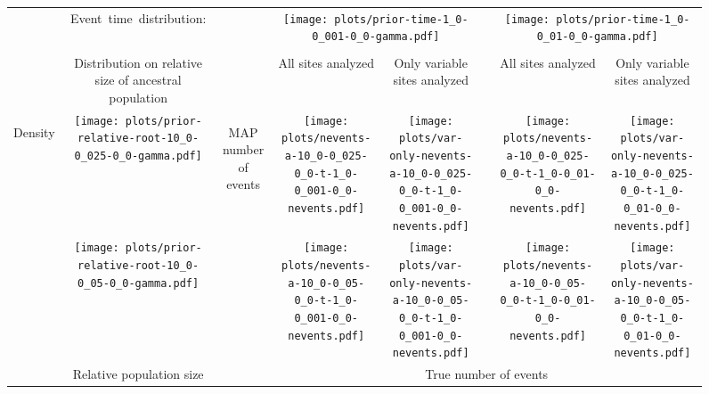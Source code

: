 \documentclass[border=10pt,varwidth=30cm]{standalone}
\begin{document}
\begin{figure}
    \centering
    \begin{tabular}{@{}cccccccc@{}}
        & \multirow{1}{0.15\textwidth}[8em]{\centering\Large Event~time~distribution:}
        &
        & \multicolumn{2}{c}{\texttt{[image: plots/prior-time-1\_0-0\_001-0\_0-gamma.pdf]}}
        &
        & \multicolumn{2}{c}{\texttt{[image: plots/prior-time-1\_0-0\_01-0\_0-gamma.pdf]}} \\
        \cline{1-2}\cline{4-5}\cline{7-8}
        & & & & & & & \\
        & \multirow{1}{0.15\textwidth}{\centering\Large Distribution on relative size of ancestral population}
        &
        & \multirow{1}{0.15\textwidth}{\centering\Large All sites analyzed}
        & \multirow{1}{0.15\textwidth}{\centering\Large Only variable sites analyzed}
        &
        & \multirow{1}{0.15\textwidth}{\centering\Large All sites analyzed}
        & \multirow{1}{0.15\textwidth}{\centering\Large Only variable sites analyzed} \\[9ex]
        \multirow{2}{*}[1em]{\begin{sideways}\large Density\end{sideways}}
        & \texttt{[image: plots/prior-relative-root-10\_0-0\_025-0\_0-gamma.pdf]}
        & \multirow{2}{*}[5em]{\begin{sideways}\large MAP number of events\end{sideways}}
        & \texttt{[image: plots/nevents-a-10\_0-0\_025-0\_0-t-1\_0-0\_001-0\_0-nevents.pdf]}
        & \texttt{[image: plots/var-only-nevents-a-10\_0-0\_025-0\_0-t-1\_0-0\_001-0\_0-nevents.pdf]}
        &
        & \texttt{[image: plots/nevents-a-10\_0-0\_025-0\_0-t-1\_0-0\_01-0\_0-nevents.pdf]}
        & \texttt{[image: plots/var-only-nevents-a-10\_0-0\_025-0\_0-t-1\_0-0\_01-0\_0-nevents.pdf]} \\
        & \texttt{[image: plots/prior-relative-root-10\_0-0\_05-0\_0-gamma.pdf]}
        &
        & \texttt{[image: plots/nevents-a-10\_0-0\_05-0\_0-t-1\_0-0\_001-0\_0-nevents.pdf]}
        & \texttt{[image: plots/var-only-nevents-a-10\_0-0\_05-0\_0-t-1\_0-0\_001-0\_0-nevents.pdf]}
        &
        & \texttt{[image: plots/nevents-a-10\_0-0\_05-0\_0-t-1\_0-0\_01-0\_0-nevents.pdf]}
        & \texttt{[image: plots/var-only-nevents-a-10\_0-0\_05-0\_0-t-1\_0-0\_01-0\_0-nevents.pdf]} \\
        & \multirow{1}{0.15\textwidth}{\centering\large Relative population size}
        &
        & \multicolumn{5}{c}{\large True number of events} \\
    \end{tabular}
\end{figure}
\end{document}
